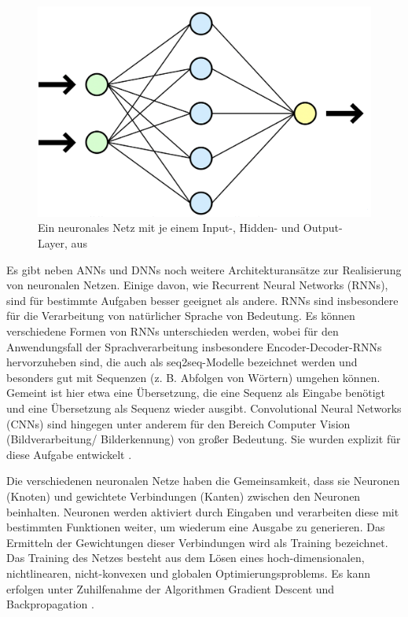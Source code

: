 \begin{figure}[h]
\centering
\includegraphics[scale=0.5]{content/pics/Picture_3.png}
\caption{Ein neuronales Netz mit je einem Input-, Hidden- und Output-Layer, aus \cite{Nielsen}}
\label{Abbildung:Nielsen}
\end{figure}

Es gibt neben ANNs und DNNs noch weitere Architekturansätze zur Realisierung von neuronalen Netzen. Einige davon, wie Recurrent Neural Networks (RNNs), sind für bestimmte Aufgaben besser geeignet als andere. RNNs sind insbesondere für die Verarbeitung von natürlicher Sprache von Bedeutung. Es können verschiedene Formen von RNNs unterschieden werden, wobei für den Anwendungsfall der Sprachverarbeitung insbesondere Encoder-Decoder-RNNs hervorzuheben sind, die auch als seq2seq-Modelle bezeichnet werden und besonders gut mit Sequenzen (z. B. Abfolgen von Wörtern) umgehen können. Gemeint ist hier etwa eine Übersetzung, die eine Sequenz als Eingabe benötigt und eine Übersetzung als Sequenz wieder ausgibt. \cite[23-28]{White} Convolutional Neural Networks (CNNs) sind hingegen unter anderem für den Bereich Computer Vision (Bildverarbeitung/ Bilderkennung) von großer Bedeutung. Sie wurden explizit für diese Aufgabe entwickelt \cite[]{LeCun}.

Die verschiedenen neuronalen Netze haben die Gemeinsamkeit, dass sie Neuronen (Knoten) und gewichtete Verbindungen (Kanten) zwischen den Neuronen beinhalten. Neuronen werden aktiviert durch Eingaben und verarbeiten diese mit bestimmten Funktionen weiter, um wiederum eine Ausgabe zu generieren. Das Ermitteln der Gewichtungen dieser Verbindungen wird als Training bezeichnet. Das Training des Netzes besteht aus dem Lösen eines hoch-dimensionalen, nichtlinearen, nicht-konvexen und globalen Optimierungsproblems. Es kann erfolgen unter Zuhilfenahme der Algorithmen Gradient Descent und Backpropagation \cite[1-13]{White}.

